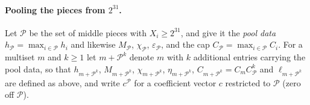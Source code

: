 \paragraph{Pooling the pieces from $2^{31}$.}
Let $\mathcal P$ be the set of middle pieces with $X_i\ge2^{31}$, and give it the
\emph{pool data} $h_{\mathcal P}=\max_{i\in\mathcal P}h_i$ and likewise
$M_{\mathcal P}$, $\chi_{\mathcal P}$, $\varepsilon_{\mathcal P}$, and the cap
$C_{\mathcal P}=\max_{i\in\mathcal P}C_i$. For a multiset $m$ and $k\ge1$ let
$m+\mathcal P^k$ denote $m$ with $k$ additional entries carrying the pool data, so
that $h_{m+\mathcal P^k}$, $M_{m+\mathcal P^k}$, $\chi_{m+\mathcal P^k}$,
$\eta_{m+\mathcal P^k}$, $C_{m+\mathcal P^k}=C_mC_{\mathcal P}^k$ and
$\ell_{m+\mathcal P^k}$ are defined as above, and write $c^{\mathcal P}$ for a
coefficient vector $c$ restricted to $\mathcal P$ (zero off $\mathcal P$).

